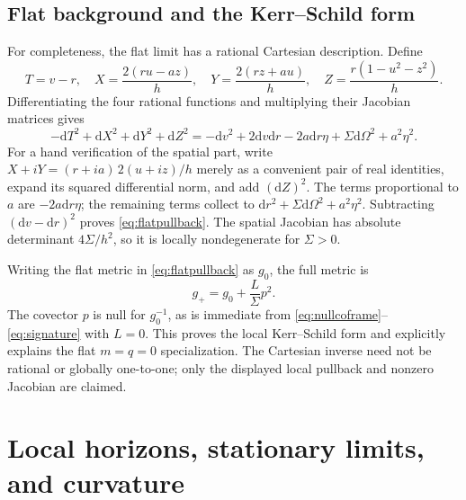 \documentclass[11pt,a4paper]{article}
\numberwithin{equation}{section}
\theoremstyle{definition}\newtheorem{definition}[theorem]{Definition}
\theoremstyle{remark}\newtheorem{remark}[theorem]{Remark}
\newcommand{\dd}{\mathrm{d}}
\begin{document}
\subsection{Flat background and the Kerr--Schild form}
For completeness, the flat limit has a rational Cartesian description. Define
\begin{equation}\label{eq:cartesian}
 T=v-r,\quad X=\frac{2(ru-az)}h,\quad
 Y=\frac{2(rz+au)}h,\quad Z=\frac{r(1-u^2-z^2)}h.
\end{equation}
Differentiating the four rational functions and multiplying their Jacobian matrices gives
\begin{equation}\label{eq:flatpullback}
 -\dd T^2+\dd X^2+\dd Y^2+\dd Z^2
 =-\dd v^2+2\dd v\dd r-2a\dd r\eta+\Sigma\dd\Omega^2+a^2\eta^2.
\end{equation}
For a hand verification of the spatial part, write $X+iY=(r+ia)\,2(u+iz)/h$ merely as a convenient pair of real identities, expand its squared differential norm, and add $(\dd Z)^2$. The terms proportional to $a$ are $-2a\dd r\eta$; the remaining terms collect to $\dd r^2+\Sigma\dd\Omega^2+a^2\eta^2$. Subtracting $(\dd v-\dd r)^2$ proves \eqref{eq:flatpullback}. The spatial Jacobian has absolute determinant $4\Sigma/h^2$, so it is locally nondegenerate for $\Sigma>0$.

Writing the flat metric in \eqref{eq:flatpullback} as $g_0$, the full metric is
\begin{equation}\label{eq:KS}
 g_+=g_0+\frac L\Sigma p^2.
\end{equation}
The covector $p$ is null for $g_0^{-1}$, as is immediate from \eqref{eq:nullcoframe}--\eqref{eq:signature} with $L=0$. This proves the local Kerr--Schild form and explicitly explains the flat $m=q=0$ specialization. The Cartesian inverse need not be rational or globally one-to-one; only the displayed local pullback and nonzero Jacobian are claimed.

\section{Local horizons, stationary limits, and curvature}\label{sec:consequences}
\end{document}
